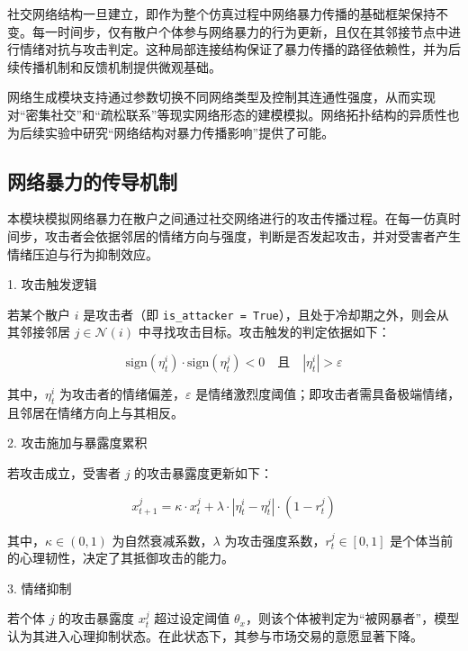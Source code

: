 社交网络结构一旦建立，即作为整个仿真过程中网络暴力传播的基础框架保持不变。每一时间步，仅有散户个体参与网络暴力的行为更新，且仅在其邻接节点中进行情绪对抗与攻击判定。这种局部连接结构保证了暴力传播的路径依赖性，并为后续传播机制和反馈机制提供微观基础。

网络生成模块支持通过参数切换不同网络类型及控制其连通性强度，从而实现对“密集社交”和“疏松联系”等现实网络形态的建模模拟。网络拓扑结构的异质性也为后续实验中研究“网络结构对暴力传播影响”提供了可能。





\subsection{网络暴力的传导机制}
\label{subsec:bullying_propagation}

本模块模拟网络暴力在散户之间通过社交网络进行的攻击传播过程。在每一仿真时间步，攻击者会依据邻居的情绪方向与强度，判断是否发起攻击，并对受害者产生情绪压迫与行为抑制效应。

1. 攻击触发逻辑

若某个散户 \( i \) 是攻击者（即 \texttt{is\_attacker = True}），且处于冷却期之外，则会从其邻接邻居 \( j \in \mathcal{N}(i) \) 中寻找攻击目标。攻击触发的判定依据如下：

\begin{equation}
\text{sign}(\eta_t^i) \cdot \text{sign}(\eta_t^j) < 0 \quad \text{且} \quad |\eta_t^i| > \varepsilon
\label{eq:attack_trigger}
\end{equation}

其中，\( \eta_t^i \) 为攻击者的情绪偏差，\( \varepsilon \) 是情绪激烈度阈值；即攻击者需具备极端情绪，且邻居在情绪方向上与其相反。

2. 攻击施加与暴露度累积

若攻击成立，受害者 \( j \) 的攻击暴露度更新如下：

\begin{equation}
x_{t+1}^j = \kappa \cdot x_t^j + \lambda \cdot |\eta_t^i - \eta_t^j| \cdot (1 - r_t^j)
\label{eq:exposure_update}
\end{equation}

其中，\( \kappa \in (0,1) \) 为自然衰减系数，\( \lambda \) 为攻击强度系数，\( r_t^j \in [0,1] \) 是个体当前的心理韧性，决定了其抵御攻击的能力。

3. 情绪抑制

若个体 \( j \) 的攻击暴露度 \( x_t^j \) 超过设定阈值 \( \theta_x \)，则该个体被判定为“被网暴者”，模型认为其进入心理抑制状态。在此状态下，其参与市场交易的意愿显著下降。

